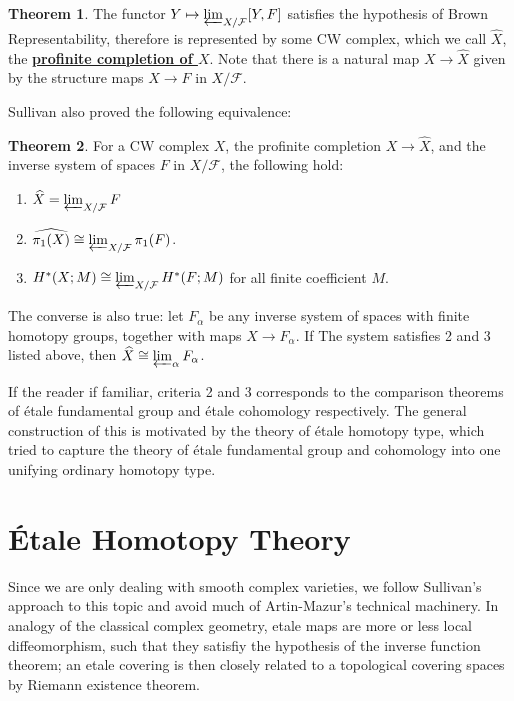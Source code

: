 \documentclass{article}
\theoremstyle{definition}
\newtheorem{theorem}{Theorem}[section]
\theoremstyle{definition}
\theoremstyle{definition}
\theoremstyle{definition}
\theoremstyle{definition}
\theoremstyle{definition}
\theoremstyle{definition}
\begin{document}
\begin{tcolorbox}[colback=red!5!white,colframe=red!30!white]
\begin{theorem}
The functor $Y\mapsto \varprojlim_{X/\mathcal{F}}[Y,F]$ satisfies the hypothesis of Brown Representability, therefore is represented by some CW complex, which we call $\widehat{X}$, the \underline{\textbf{profinite completion of $X$}}. Note that there is a natural map $X\to \widehat{X}$ given by the structure maps $X\to F$ in $X/\mathcal{F}$.
\end{theorem}
\end{tcolorbox}
Sullivan also proved the following equivalence:

\begin{tcolorbox}[colback=red!5!white,colframe=red!30!white]
\begin{theorem}
For a CW complex $X$, the profinite completion $X\to \widehat{X}$, and the inverse system of spaces ${F}$ in $X/\mathcal{F}$, the following hold:
\begin{enumerate}
	\item $\widehat{X}=\varprojlim_{X/\mathcal{F}}F$
	\item $\widehat{\pi_1(X)}\cong \varprojlim_{X/\mathcal{F}}\pi_1(F)$.
	\item $H^*(X;M)\cong \varprojlim_{X/\mathcal{F}}H^*(F;M)$ for all finite coefficient $M$.
\end{enumerate}
The converse is also true: let ${F_{\alpha}}$ be any inverse system of spaces with finite homotopy groups, together with maps $X\to F_{\alpha}$. If The system satisfies 2 and $3$ listed above, then $\widehat{X}\cong \varprojlim_{\alpha} F_{\alpha}$.
\end{theorem}
\end{tcolorbox}

If the reader if familiar, criteria 2 and 3 corresponds to the comparison theorems of \'etale fundamental group and  \'etale cohomology respectively. The general construction of this is motivated by the theory of \'etale homotopy type, which tried to capture the theory of \'etale fundamental group and cohomology into one unifying ordinary homotopy type. 

\section{\'Etale Homotopy Theory}
Since we are only dealing with smooth complex varieties, we follow Sullivan's approach to this topic and avoid much of Artin-Mazur's technical machinery. In analogy of the classical complex geometry, etale maps are more or less local diffeomorphism, such that they satisfiy the hypothesis of the inverse function theorem; an etale covering is then closely related to a topological covering spaces by Riemann existence theorem.
\end{document}
